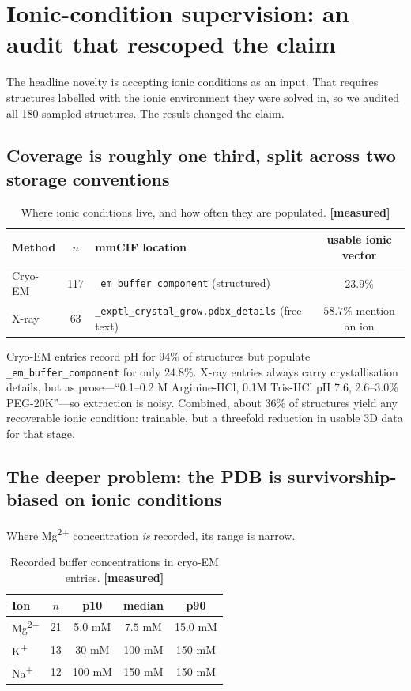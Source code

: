 \documentclass[11pt,a4paper]{article}
\newcommand{\meas}{\textcolor{measured}{\textbf{[measured]}}}
\begin{document}
\section{Ionic-condition supervision: an audit that rescoped the claim}
\label{sec:r2}

The headline novelty is accepting ionic conditions as an input. That requires
structures labelled with the ionic environment they were solved in, so we
audited all 180 sampled structures. The result changed the claim.

\subsection{Coverage is roughly one third, split across two storage conventions}

\begin{table}[h]
\centering
\caption{Where ionic conditions live, and how often they are populated. \meas}
\begin{tabular}{lclc}
\toprule
\textbf{Method} & \textbf{$n$} & \textbf{mmCIF location} & \textbf{usable ionic vector} \\
\midrule
Cryo-EM & 117 & \texttt{\_em\_buffer\_component} (structured) & $\mathbf{23.9\%}$ \\
X-ray   & 63  & \texttt{\_exptl\_crystal\_grow.pdbx\_details} (free text) & $58.7\%$ mention an ion \\
\bottomrule
\end{tabular}
\end{table}

Cryo-EM entries record pH for $94\%$ of structures but populate
\texttt{\_em\_buffer\_component} for only $24.8\%$. X-ray entries always carry
crystallisation details, but as prose---``0.1--0.2 M Arginine-HCl, 0.1M Tris-HCl
pH 7.6, 2.6--3.0\% PEG-20K''---so extraction is noisy. Combined, about $36\%$ of
structures yield any recoverable ionic condition: trainable, but a threefold
reduction in usable 3D data for that stage.

\subsection{The deeper problem: the PDB is survivorship-biased on ionic conditions}

Where Mg\textsuperscript{2+} concentration \emph{is} recorded, its range is narrow.

\begin{table}[h]
\centering
\caption{Recorded buffer concentrations in cryo-EM entries. \meas}
\begin{tabular}{lcccc}
\toprule
\textbf{Ion} & \textbf{$n$} & \textbf{p10} & \textbf{median} & \textbf{p90} \\
\midrule
Mg\textsuperscript{2+} & 21 & 5.0 mM & $\mathbf{7.5}$ mM & 15.0 mM \\
K\textsuperscript{+}   & 13 & 30 mM  & 100 mM & 150 mM \\
Na\textsuperscript{+}  & 12 & 100 mM & 150 mM & 150 mM \\
\bottomrule
\end{tabular}
\end{table}
\end{document}

